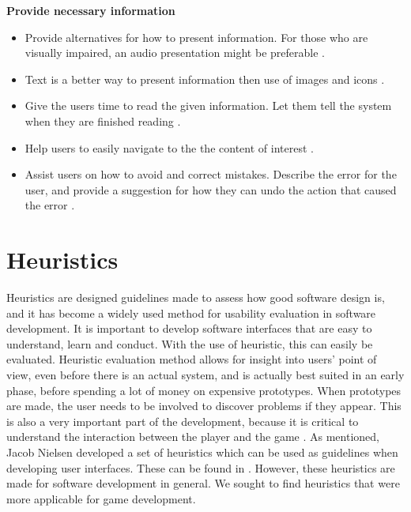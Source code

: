 \textbf{Provide necessary information}
\begin{itemize}
\item Provide alternatives for how to present information. For those who are visually impaired, an audio presentation might be preferable \cite{blindeforbundetTekst} \cite{w3cTekst}. 
\item Text is a better way to present information then use of images and icons \cite{w3cTekst}.
\item Give the users time to read the given information. Let them tell the system when they are finished reading \cite{w3cTekst}.  
\item Help users to easily navigate to the the content of interest \cite{w3cTekst}.
\item Assist users on how to avoid and correct mistakes. Describe the error for the user, and provide a suggestion for how they can undo the action that caused the error \cite{w3cTekst}.      
\end{itemize}

\section{Heuristics}
\label{sec:heur}
Heuristics are designed guidelines made to assess how good software design is, and it has become a widely used method for usability evaluation in software development. It is important to develop software interfaces that are easy to understand, learn and conduct. With the use of heuristic, this can easily be evaluated. Heuristic evaluation method allows for insight into users' point of view, even before there is an actual system, and is actually best suited in an early phase, before spending a lot of money on expensive prototypes.  When prototypes are made, the user needs to be involved to discover problems if they appear. This is also a very important part of the development, because it is critical to understand the interaction between the player and the game \cite{desurvire}. As mentioned, Jacob Nielsen developed a set of heuristics which can be used as guidelines when developing user interfaces. These can be found in \cite{nielsen2005ten}. However, these heuristics are made for software development in general. We sought to find heuristics that were more applicable for game development. 

